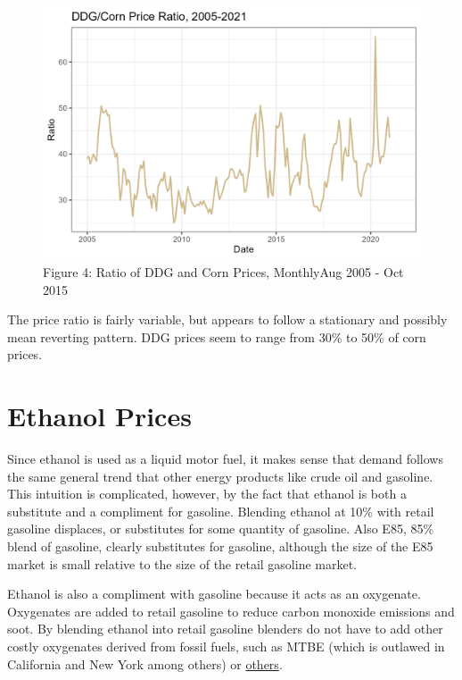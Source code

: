 \documentclass[
  letterpaper,
  DIV=11,
  numbers=noendperiod]{scrreprt}
\begin{document}
\begin{figure}[H]

{\centering \includegraphics{assets/DDGCORNRatio.png}

}

\caption{Figure 4: Ratio of DDG and Corn Prices, MonthlyAug 2005 - Oct
2015}

\end{figure}%

The price ratio is fairly variable, but appears to follow a stationary
and possibly mean reverting pattern. DDG prices seem to range from 30\%
to 50\% of corn prices.

\section{Ethanol Prices}\label{ethanol-prices}

Since ethanol is used as a liquid motor fuel, it makes sense that demand
follows the same general trend that other energy products like crude oil
and gasoline. This intuition is complicated, however, by the fact that
ethanol is both a substitute and a compliment for gasoline. Blending
ethanol at 10\% with retail gasoline displaces, or substitutes for some
quantity of gasoline. Also E85, 85\% blend of gasoline, clearly
substitutes for gasoline, although the size of the E85 market is small
relative to the size of the retail gasoline market.

Ethanol is also a compliment with gasoline because it acts as an
oxygenate. Oxygenates are added to retail gasoline to reduce carbon
monoxide emissions and soot. By blending ethanol into retail gasoline
blenders do not have to add other costly oxygenates derived from fossil
fuels, such as MTBE (which is outlawed in California and New York among
others) or \href{https://en.wikipedia.org/wiki/Oxygenate}{others}.
\end{document}
